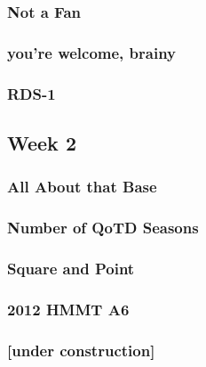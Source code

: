 \documentclass[titlepage=true]{scrartcl}
\begin{document}
    \subsubsection{Not a Fan}
	\label{14-1-5}
	
	\newpage

	\subsubsection{you're welcome, brainy}
	\label{14-1-6}
	
	\newpage

	\subsubsection{RDS-1}
	\label{14-1-7}
	
	\newpage
	
    \subsection{Week 2}
	
	\subsubsection{All About that Base}
	\label{14-2-1}
	
	\newpage

	\subsubsection{Number of QoTD Seasons}
	\label{14-2-2}
	
	\newpage

	\subsubsection{Square and Point}
	\label{14-2-3}
	
	\newpage

	\subsubsection{2012 HMMT A6}
	\label{14-2-4}
	
	\newpage

	\subsubsection{[under construction]}
	\label{14-2-5}
	\newpage
\end{document}
